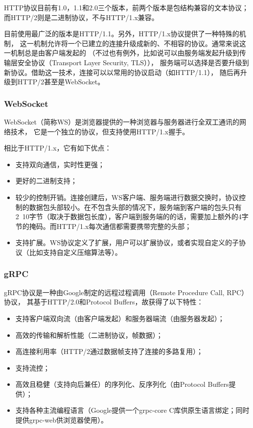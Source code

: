 HTTP协议目前有1.0，1.1和2.0三个版本，前两个版本是包结构兼容的文本协议；而HTTP/2则是二进制协议\cite{rfc7540}，不与HTTP/1.x兼容。

目前使用最广泛的版本是HTTP/1.1。另外，HTTP/1.x协议提供了一种特殊的机制，
这一机制允许将一个已建立的连接升级成新的、不相容的协议。通常来说这一机制总是由客户端发起的
（不过也有例外，比如说可以由服务端发起升级到传输层安全协议\cite{rfc8446}（Transport Layer Security, TLS）），
服务端可以选择是否要升级到新协议。借助这一技术，连接可以以常用的协议启动（如HTTP/1.1），
随后再升级到HTTP/2甚至是WebSocket\cite{rfc6455}。

\subsubsection{WebSocket}

WebSocket（简称WS）是浏览器提供的一种浏览器与服务器进行全双工通讯的网络技术，
它是一个独立的协议，但支持使用HTTP/1.x握手。

相比于HTTP/1.x，它有如下优点：

\begin{itemize}
    \item 支持双向通信，实时性更强；
    \item 更好的二进制支持；
    \item 较少的控制开销。连接创建后，WS客户端、服务端进行数据交换时，协议控制的数据包头部较小。在不包含头部的情况下，服务端到客户端的包头只有2~10字节（取决于数据包长度），客户端到服务端的的话，需要加上额外的4字节的掩码。而HTTP/1.x每次通信都需要携带完整的头部；
    \item 支持扩展。WS协议定义了扩展，用户可以扩展协议，或者实现自定义的子协议（比如支持自定义压缩算法等）。
\end{itemize}

\subsubsection{gRPC}

gRPC协议\cite{grpc}是一种由Google制定的远程过程调用（Remote Procedure Call, RPC）协议，
其基于HTTP/2.0和Protocol Buffers\cite{protocol-buffers}，故获得了以下特性：

\begin{itemize}
    \item 支持客户端双向流（由客户端发起）和服务器端流（由服务器发起）；
    \item 高效的传输和解析性能（二进制协议，帧数据）；
    \item 高连接利用率（HTTP/2通过数据帧支持了连接的多路复用）；
    \item 支持流控；
    \item 高效且稳健（支持向后兼任）的序列化、反序列化（由Protocol Buffers提供）；
    \item 支持各种主流编程语言（Google提供一个grpc-core C库供原生语言绑定；同时提供grpc-web供浏览器使用）。
\end{itemize}

